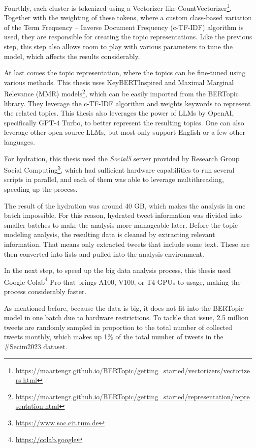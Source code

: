 Fourthly, each cluster is tokenized using a Vectorizer like 
CountVectorizer\footnote{\url{https://maartengr.github.io/BERTopic/getting_started/vectorizers/vectorizers.html}}. 
Together with the weighting of these tokens, where a custom 
class-based variation of the Term Frequency -- Inverse Document Frequency (c-TF-IDF) algorithm 
is used, they are responsible for creating the topic representations. 
Like the previous step, this step also allows room to play with various parameters 
to tune the model, which affects the results considerably.

At last comes the topic representation, where the topics can be fine-tuned 
using various methods. This thesis uses KeyBERTInspired and Maximal Marginal Relevance (MMR) 
models\footnote{\url{https://maartengr.github.io/BERTopic/getting_started/representation/representation.html}}, 
which can be easily imported from the BERTopic library. They leverage the c-TF-IDF algorithm 
and weights keywords to represent the related topics. 
This thesis also leverages the power of LLMs by OpenAI, specifically GPT-4 Turbo, 
to better represent the resulting topics. One can also leverage other open-source LLMs, 
but most only support English or a few other languages.

For hydration, this thesis used the \textit{Social5} server provided by Research Group Social 
Computing\footnote{\url{https://www.soc.cit.tum.de}}, which had sufficient hardware 
capabilities to run several scripts in parallel, and each of them was able to leverage 
multithreading, speeding up the process.

The result of the hydration was around 40 GB, which makes the analysis in one batch impossible. 
For this reason, hydrated tweet information was divided into smaller batches to make the 
analysis more manageable later.
Before the topic modeling analysis, the resulting data is cleaned by extracting relevant 
information. That means only extracted tweets that include some text. These are then 
converted into lists and pulled into the analysis environment.

In the next step, to speed up the big data analysis process, this thesis used Google 
Colab\footnote{\url{https://colab.google}} Pro that brings A100, V100, or T4 GPUs to usage, 
making the process considerably faster. 

As mentioned before, because the data is big, it does not fit into the BERTopic model 
in one batch due to hardware restrictions. To tackle that issue, 2.5 million tweets are 
randomly sampled in proportion to the total number of collected tweets monthly, which 
makes up 1\% of the total number of tweets in the \#Secim2023 dataset. 

